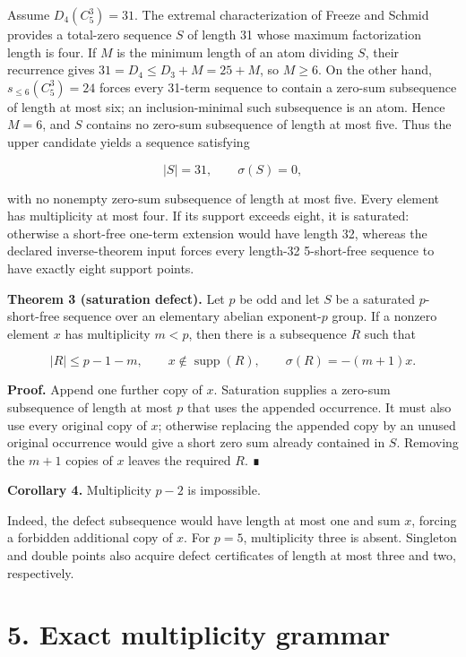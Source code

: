 \documentclass[
  11pt,
]{article}
\begin{document}
Assume \(D_4(C_5^3)=31\). The extremal characterization of Freeze and
Schmid provides a total-zero sequence \(S\) of length 31 whose maximum
factorization length is four. If \(M\) is the minimum length of an atom
dividing \(S\), their recurrence gives \(31=D_4\le D_3+M=25+M\), so
\(M\ge6\). On the other hand, \(s_{\le6}(C_5^3)=24\) forces every
31-term sequence to contain a zero-sum subsequence of length at most
six; an inclusion-minimal such subsequence is an atom. Hence \(M=6\),
and \(S\) contains no zero-sum subsequence of length at most five. Thus
the upper candidate yields a sequence satisfying

\[
|S|=31, \qquad \sigma(S)=0,
\]

with no nonempty zero-sum subsequence of length at most five. Every
element has multiplicity at most four. If its support exceeds eight, it
is saturated: otherwise a short-free one-term extension would have
length 32, whereas the declared inverse-theorem input forces every
length-32 5-short-free sequence to have exactly eight support points.

\textbf{Theorem 3 (saturation defect).} Let \(p\) be odd and let \(S\)
be a saturated \(p\)-short-free sequence over an elementary abelian
exponent-\(p\) group. If a nonzero element \(x\) has multiplicity
\(m<p\), then there is a subsequence \(R\) such that

\[
|R|\le p-1-m,
\qquad x\notin\operatorname{supp}(R),
\qquad \sigma(R)=-(m+1)x.
\]

\textbf{Proof.} Append one further copy of \(x\). Saturation supplies a
zero-sum subsequence of length at most \(p\) that uses the appended
occurrence. It must also use every original copy of \(x\); otherwise
replacing the appended copy by an unused original occurrence would give
a short zero sum already contained in \(S\). Removing the \(m+1\) copies
of \(x\) leaves the required \(R\). ∎

\textbf{Corollary 4.} Multiplicity \(p-2\) is impossible.

Indeed, the defect subsequence would have length at most one and sum
\(x\), forcing a forbidden additional copy of \(x\). For \(p=5\),
multiplicity three is absent. Singleton and double points also acquire
defect certificates of length at most three and two, respectively.

\hypertarget{exact-multiplicity-grammar}{%
\section{5. Exact multiplicity
grammar}\label{exact-multiplicity-grammar}}
\end{document}
